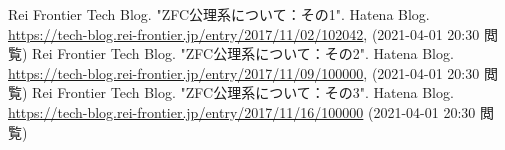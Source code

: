 \documentclass[a4paper]{jsarticle}
\begin{document}
\begin{thebibliography}{50}
      Rei Frontier Tech Blog. "ZFC公理系について：その1". Hatena Blog. \url{https://tech-blog.rei-frontier.jp/entry/2017/11/02/102042}, (2021-04-01 20:30 閲覧)
      Rei Frontier Tech Blog. "ZFC公理系について：その2". Hatena Blog. \url{https://tech-blog.rei-frontier.jp/entry/2017/11/09/100000}, (2021-04-01 20:30 閲覧)
      Rei Frontier Tech Blog. "ZFC公理系について：その3". Hatena Blog. \url{https://tech-blog.rei-frontier.jp/entry/2017/11/16/100000} (2021-04-01 20:30 閲覧)
\end{thebibliography}
\end{document}
